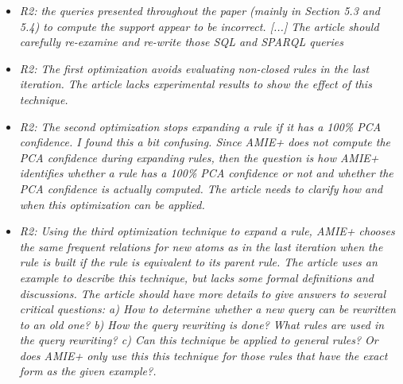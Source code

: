\begin{figure*}[t!]
\hspace{.1\textwidth}
\begin{minipage}{.8\textwidth}
\large 
     \begin{itemize}
   
      \item \textit{R2: the queries presented throughout the paper (mainly in Section 5.3 and 5.4) to compute the support appear to be incorrect. [...]
      The article should carefully re-examine and re-write those SQL and SPARQL queries\\  }
      
      \item \textit{R2: The first optimization avoids evaluating non-closed rules in the last iteration. The article lacks experimental results to show the effect of this technique.\\  }
      
      \item \textit{R2: The second optimization stops expanding a rule if it has a 100\% PCA confidence. I found this a bit confusing. 
      Since AMIE+ does not compute the PCA confidence during expanding rules, then the question is how AMIE+ identifies whether a rule has a 100\% PCA 
      confidence or not and whether the PCA confidence is actually computed. The article needs to clarify how and when this optimization can be applied.\\  }
      
      \item \textit{R2: Using the third optimization technique to expand a rule, AMIE+ chooses the same frequent relations for new atoms as in the last iteration 
      when the rule is built if the rule is equivalent to its parent rule. 
      The article uses an example to describe this technique, but lacks some formal definitions and discussions. 
      The article should have more details to give answers to several critical questions: a) How to determine whether a new query can be rewritten to an old one? 
      b) How the query rewriting is done? What rules are used in the query rewriting? 
      c) Can this technique be applied to general rules? Or does AMIE+ only use this this technique for those rules that have the exact form as the given example?.\\ }
      
      
\end{itemize}
\end{minipage}
\end{figure*}

